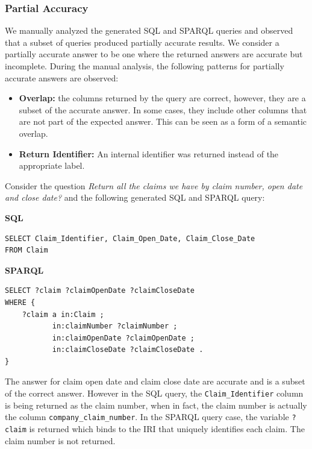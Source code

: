 \documentclass[11pt]{article}
\begin{document}
\subsubsection{Partial Accuracy}

We manually analyzed the generated SQL and SPARQL queries and observed that a subset of queries produced partially accurate results.
We consider a partially accurate answer to be one where the returned answers are accurate but incomplete. 
During the manual analysis, the following patterns for partially accurate answers are observed: 

\begin{itemize}
    \item \textbf{Overlap:} the columns returned by the query are correct, however, they are  a subset of the accurate answer. In some cases, they include other columns that are not part of the expected answer. This can be seen as a form of a semantic overlap\cite{DBLP:conf/dexa/GodfreyG99}. 
    \item \textbf{Return Identifier:} An internal identifier was returned instead of the appropriate label.   
\end{itemize}

Consider the question \textit{Return all the claims we have by claim number, open date and close date?} and the following generated SQL and SPARQL query: 

\textbf{SQL}
\begin{verbatim}
SELECT Claim_Identifier, Claim_Open_Date, Claim_Close_Date
FROM Claim
\end{verbatim}

\textbf{SPARQL}
\begin{verbatim}
SELECT ?claim ?claimOpenDate ?claimCloseDate
WHERE {
    ?claim a in:Claim ;
           in:claimNumber ?claimNumber ;
           in:claimOpenDate ?claimOpenDate ;
           in:claimCloseDate ?claimCloseDate .
}
\end{verbatim}

The answer for claim open date and claim close date are accurate and is a subset of the correct answer. 
However in the SQL query, the \texttt{Claim\_Identifier} column is being returned as the claim number, when in fact, the claim number is actually the column \texttt{company\_claim\_number}. 
In the SPARQL query case, the variable \texttt{?claim} is returned which binds to the IRI that uniquely identifies each claim. 
The claim number is not returned.

\end{document}
